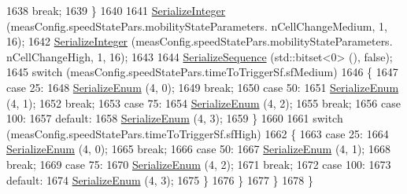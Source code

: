 \begin{DoxyCode}
1638               \textcolor{keywordflow}{break};
1639             \}
1640 
1641           \hyperlink{classns3_1_1Asn1Header_ab1c3bd37730affa7473bc759d625c29a}{SerializeInteger} (measConfig.speedStatePars.mobilityStateParameters.
      nCellChangeMedium, 1, 16);
1642           \hyperlink{classns3_1_1Asn1Header_ab1c3bd37730affa7473bc759d625c29a}{SerializeInteger} (measConfig.speedStatePars.mobilityStateParameters.
      nCellChangeHigh, 1, 16);
1643 
1644           \hyperlink{classns3_1_1Asn1Header_aa9744858380443ed95836fed08799aed}{SerializeSequence} (std::bitset<0> (), \textcolor{keyword}{false});
1645           \textcolor{keywordflow}{switch} (measConfig.speedStatePars.timeToTriggerSf.sfMedium)
1646             \{
1647             \textcolor{keywordflow}{case} 25:
1648               \hyperlink{classns3_1_1Asn1Header_ac8e56956823ab8e4470c09e162e7bf24}{SerializeEnum} (4, 0);
1649               \textcolor{keywordflow}{break};
1650             \textcolor{keywordflow}{case} 50:
1651               \hyperlink{classns3_1_1Asn1Header_ac8e56956823ab8e4470c09e162e7bf24}{SerializeEnum} (4, 1);
1652               \textcolor{keywordflow}{break};
1653             \textcolor{keywordflow}{case} 75:
1654               \hyperlink{classns3_1_1Asn1Header_ac8e56956823ab8e4470c09e162e7bf24}{SerializeEnum} (4, 2);
1655               \textcolor{keywordflow}{break};
1656             \textcolor{keywordflow}{case} 100:
1657             \textcolor{keywordflow}{default}:
1658               \hyperlink{classns3_1_1Asn1Header_ac8e56956823ab8e4470c09e162e7bf24}{SerializeEnum} (4, 3);
1659             \}
1660 
1661           \textcolor{keywordflow}{switch} (measConfig.speedStatePars.timeToTriggerSf.sfHigh)
1662             \{
1663             \textcolor{keywordflow}{case} 25:
1664               \hyperlink{classns3_1_1Asn1Header_ac8e56956823ab8e4470c09e162e7bf24}{SerializeEnum} (4, 0);
1665               \textcolor{keywordflow}{break};
1666             \textcolor{keywordflow}{case} 50:
1667               \hyperlink{classns3_1_1Asn1Header_ac8e56956823ab8e4470c09e162e7bf24}{SerializeEnum} (4, 1);
1668               \textcolor{keywordflow}{break};
1669             \textcolor{keywordflow}{case} 75:
1670               \hyperlink{classns3_1_1Asn1Header_ac8e56956823ab8e4470c09e162e7bf24}{SerializeEnum} (4, 2);
1671               \textcolor{keywordflow}{break};
1672             \textcolor{keywordflow}{case} 100:
1673             \textcolor{keywordflow}{default}:
1674               \hyperlink{classns3_1_1Asn1Header_ac8e56956823ab8e4470c09e162e7bf24}{SerializeEnum} (4, 3);
1675             \}
1676         \}
1677     \}
1678 \}
\end{DoxyCode}


